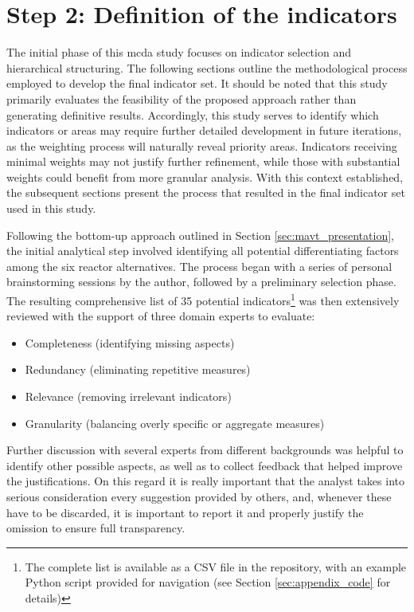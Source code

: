 \section{Step 2: Definition of the indicators}
\label{sec:brainstorming_indicators}
The initial phase of this \gls{mcda} study focuses on indicator selection and hierarchical structuring. The following sections outline the methodological process employed to develop the final indicator set. It should be noted that this study primarily evaluates the feasibility of the proposed approach rather than generating definitive results. Accordingly, this study serves to identify which indicators or areas may require further detailed development in future iterations, as the weighting process will naturally reveal priority areas. Indicators receiving minimal weights may not justify further refinement, while those with substantial weights could benefit from more granular analysis. With this context established, the subsequent sections present the process that resulted in the final indicator set used in this study.


Following the bottom-up approach outlined in Section \ref{sec:mavt_presentation}, the initial analytical step involved identifying all potential differentiating factors among the six reactor alternatives. The process began with a series of personal brainstorming sessions by the author, followed by a preliminary selection phase. The resulting comprehensive list of 35 potential indicators\footnote{The complete list is available as a CSV file in the repository, with an example Python script provided for navigation (see Section \ref{sec:appendix_code} for details)} was then extensively reviewed with the support of three domain experts to evaluate:
\begin{itemize}
    \item Completeness (identifying missing aspects)
    \item Redundancy (eliminating repetitive measures)
    \item Relevance (removing irrelevant indicators)
    \item Granularity (balancing overly specific or aggregate measures)
\end{itemize}

Further discussion with several experts from different backgrounds was helpful to identify other possible aspects, as well as to collect feedback that helped improve the justifications. On this regard it is really important that the analyst takes into serious consideration every suggestion provided by others, and, whenever these have to be discarded, it is important to report it and properly justify the omission to ensure full transparency.


